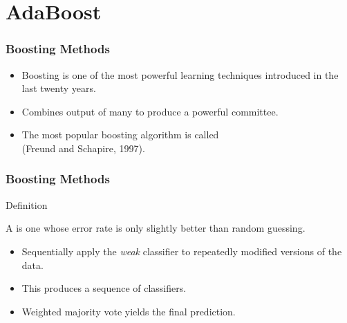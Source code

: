 \def\err{{\mathop{\overline{\mathsf{err}}}}}

\section{AdaBoost}


\begin{frame}
  \frametitle{Boosting Methods}

  \begin{itemize}
    \item Boosting is one of the most powerful learning techniques introduced in the last twenty years.
    \item Combines output of many  to produce a powerful committee.
    \item The most popular boosting algorithm is called  \\
      (Freund and Schapire, 1997).
  \end{itemize}
\end{frame}


\begin{frame}
  \frametitle{Boosting Methods \cont}

  \begin{citeblock}{Definition}

    A  is one whose error rate is only slightly better than random guessing.
  \end{citeblock}
  \pspread


  \begin{itemize}
    \item Sequentially apply the \emph{weak} classifier to repeatedly modified versions of the data.
    \item This produces a sequence of classifiers.
    \item Weighted majority vote yields the final prediction.
  \end{itemize}
\end{frame}


